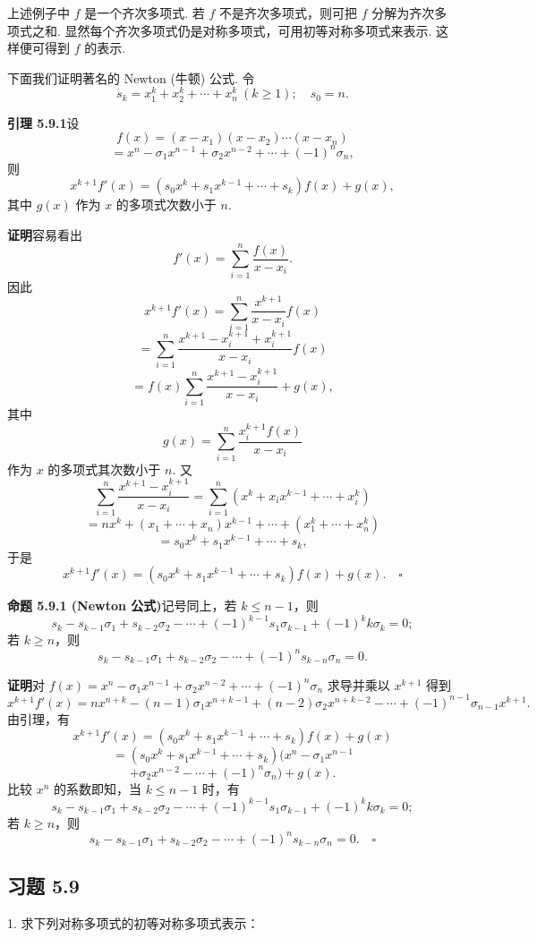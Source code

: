 \documentclass[UTF8,12pt,a4paper,fontset=fandol]{ctexart}
\begin{document}
上述例子中 $f$ 是一个齐次多项式. 若 $f$ 不是齐次多项式，则可把 $f$ 分解为齐次多项式之和. 显然每个齐次多项式仍是对称多项式，可用初等对称多项式来表示. 这样便可得到 $f$ 的表示.

下面我们证明著名的 Newton (牛顿) 公式. 令
\[
s_k=x_1^k+x_2^k+\cdots+x_n^k\ (k\geq 1);\quad s_0=n.
\]

\noindent\textbf{引理 5.9.1}\quad 设
\[
f(x)=(x-x_1)(x-x_2)\cdots(x-x_n)
\]
\[
=x^n-\sigma_1x^{n-1}+\sigma_2x^{n-2}+\cdots+(-1)^n\sigma_n,
\]
则
\[
x^{k+1}f'(x)=(s_0x^k+s_1x^{k-1}+\cdots+s_k)f(x)+g(x),
\]
其中 $g(x)$ 作为 $x$ 的多项式次数小于 $n$.

\noindent\textbf{证明}\quad 容易看出
\[
f'(x)=\sum_{i=1}^n\frac{f(x)}{x-x_i}.
\]
因此
\[
x^{k+1}f'(x)=\sum_{i=1}^n\frac{x^{k+1}}{x-x_i}f(x)
\]
\[
=\sum_{i=1}^n\frac{x^{k+1}-x_i^{k+1}+x_i^{k+1}}{x-x_i}f(x)
\]
\[
=f(x)\sum_{i=1}^n\frac{x^{k+1}-x_i^{k+1}}{x-x_i}+g(x),
\]
其中
\[
g(x)=\sum_{i=1}^n\frac{x_i^{k+1}f(x)}{x-x_i}
\]
作为 $x$ 的多项式其次数小于 $n$. 又
\[
\sum_{i=1}^n\frac{x^{k+1}-x_i^{k+1}}{x-x_i}
=\sum_{i=1}^n(x^k+x_ix^{k-1}+\cdots+x_i^k)
\]
\[
=nx^k+(x_1+\cdots+x_n)x^{k-1}+\cdots+(x_1^k+\cdots+x_n^k)
\]
\[
=s_0x^k+s_1x^{k-1}+\cdots+s_k,
\]
于是
\[
x^{k+1}f'(x)=(s_0x^k+s_1x^{k-1}+\cdots+s_k)f(x)+g(x).\quad \square
\]

\noindent\textbf{命题 5.9.1 (Newton 公式)}\quad 记号同上，若 $k\leq n-1$，则
\[
s_k-s_{k-1}\sigma_1+s_{k-2}\sigma_2-\cdots+(-1)^{k-1}s_1\sigma_{k-1}+(-1)^kk\sigma_k=0;
\]
若 $k\geq n$，则
\[
s_k-s_{k-1}\sigma_1+s_{k-2}\sigma_2-\cdots+(-1)^ns_{k-n}\sigma_n=0.
\]

\noindent\textbf{证明}\quad 对 $f(x)=x^n-\sigma_1x^{n-1}+\sigma_2x^{n-2}+\cdots+(-1)^n\sigma_n$ 求导并乘以 $x^{k+1}$ 得到
\[
x^{k+1}f'(x)=nx^{n+k}-(n-1)\sigma_1x^{n+k-1}+(n-2)\sigma_2x^{n+k-2}-\cdots+(-1)^{n-1}\sigma_{n-1}x^{k+1}.
\]
由引理，有
\[
x^{k+1}f'(x)=(s_0x^k+s_1x^{k-1}+\cdots+s_k)f(x)+g(x)
\]
\[
=(s_0x^k+s_1x^{k-1}+\cdots+s_k)(x^n-\sigma_1x^{n-1}
\]
\[
+\sigma_2x^{n-2}-\cdots+(-1)^n\sigma_n)+g(x).
\]
比较 $x^n$ 的系数即知，当 $k\leq n-1$ 时，有
\[
s_k-s_{k-1}\sigma_1+s_{k-2}\sigma_2-\cdots+(-1)^{k-1}s_1\sigma_{k-1}+(-1)^kk\sigma_k=0;
\]
若 $k\geq n$，则
\[
s_k-s_{k-1}\sigma_1+s_{k-2}\sigma_2-\cdots+(-1)^ns_{k-n}\sigma_n=0.\quad \square
\]

\subsection*{习题 5.9}

1. 求下列对称多项式的初等对称多项式表示：
\end{document}
